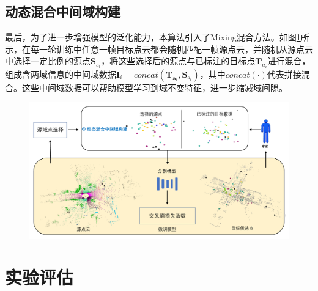 


\subsection{动态混合中间域构建}
最后，为了进一步增强模型的泛化能力，本算法引入了Mixing混合方法。如图\ref{fig:3-4}所示，在每一轮训练中任意一帧目标点云都会随机匹配一帧源点云，并随机从源点云中选择一定比例的源点\(\mathbf{S}_{s_i}\)，将这些选择后的源点与已标注的目标点\(\mathbf{T}_{a_i}\)进行混合，组成含两域信息的中间域数据\(\mathbf{I}_i=concat(\mathbf{T_{a_i}},\mathbf{S_{s_i}})\)，其中\(concat(\cdot)\)代表拼接混合。这些中间域数据可以帮助模型学习到域不变特征，进一步缩减域间隙。

\vspace{-0.1cm}
\begin{figure}[h]
    \centering
    \includegraphics[width = \textwidth, scale=0.5]{ljx/figure/3-4.pdf}
    \label{fig:3-4}
\end{figure}
\vspace{-0.35cm}

\section{实验评估}
